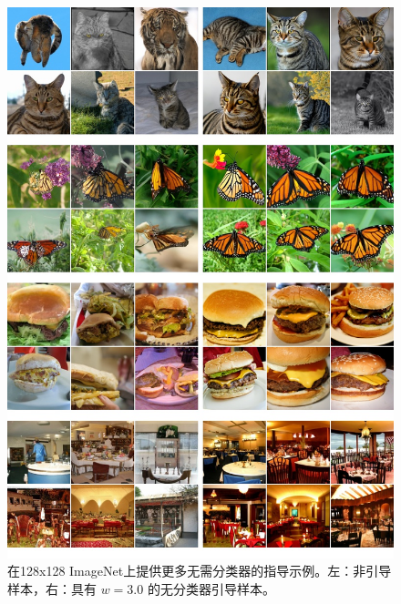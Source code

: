 \documentclass{article}
\begin{document}
 \begin{figure}[t] \centering
\includegraphics[width=\linewidth]{images/i128_more_samples.jpg}
\caption{
在128x128 ImageNet上提供更多无需分类器的指导示例。左：非引导样本，右：具有 $w=3.0$ 的无分类器引导样本。}
\label{fig:i128_guidance_more}
\end{figure} 
\end{document}
